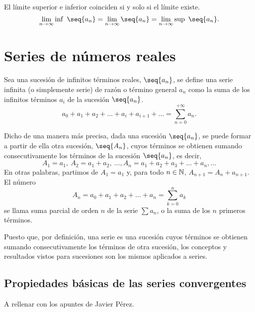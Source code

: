 \begin{prop}
    El límite superior e inferior coinciden si y solo si el límite existe.
    \begin{equation}
        \lim_{n\to\infty}\inf\ \seq{a_n} = \lim_{n\to\infty}\seq{a_n} = \lim_{n\to\infty}\sup\ \seq{a_n}.
    \end{equation}
\end{prop}

\section{Series de números reales}
\begin{defi}[Serie]
    Sea una sucesión de infinitos términos reales, $\seq{a_n}$, se define una serie infinita (o simplemente serie) de razón o término general $a_n$ como la suma de los infinitos términos $a_i$ de la sucesión $\seq{a_n}$.
    \begin{equation}
        a_0 + a_1 + a_2 + \ldots + a_i + a_{i + 1} + \ldots = \sum_{n=0}^{+\infty}a_n.
    \end{equation}
\end{defi}

Dicho de una manera más precisa, dada una sucesión $\seq{a_n}$, se puede formar a partir de ella otra sucesión, $\seq{A_n}$, cuyos términos se obtienen sumando consecutivamente los términos de la sucesión $\seq{a_n}$, es decir,
\begin{equation}
    A_1 = a_1,\ A_2 = a_1 + a_2,\ \ldots, A_n = a_1 + a_2 + a_3 + \ldots + a_n, \ldots
\end{equation}
En otras palabras, partimos de $A_1 = a_1$ y, para todo $n\in\mathbb{N}$, $A_{n + 1} = A_n + a_{n + 1}$. El número
\begin{equation}
    A_n = a_0 + a_1 + a_2 + \ldots + a_n = \sum_{k=0}^n a_k
\end{equation}
se llama suma parcial de orden $n$ de la serie $\sum a_n$, o la suma de los $n$ primeros términos.


\begin{remark}
    Puesto que, por definición, una serie es una sucesión cuyos términos se obtienen sumando consecutivamente los términos de otra sucesión, los conceptos y resultados vistos para sucesiones son los mismos aplicados a series.
\end{remark}

\subsection{Propiedades básicas de las series convergentes}
A rellenar con los apuntes de Javier Pérez.

